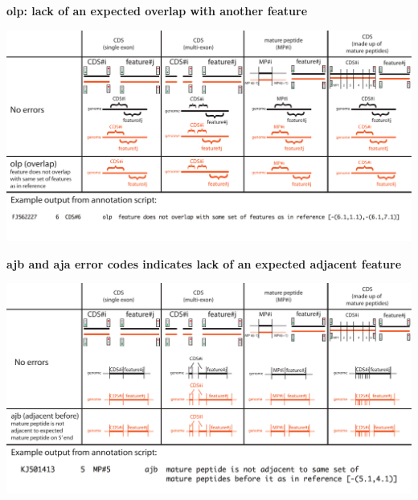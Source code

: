 \documentclass[landscape]{slides}
\begin{document}
\begin{slide}
\begin{center}
\textbf{olp: lack of an expected overlap with another feature}
\vspace{0.5in}

\includegraphics[width=10in]{figs/errornew-3-olp}
\end{center}
\vfill
\end{slide}
\begin{slide}
\begin{center}
\textbf{ajb and aja error codes indicates lack of an expected adjacent feature}
\vspace{0.5in}

\includegraphics[width=10in]{figs/errornew-4-ajb}
\end{center}
\vfill
\end{slide}
\end{document}
